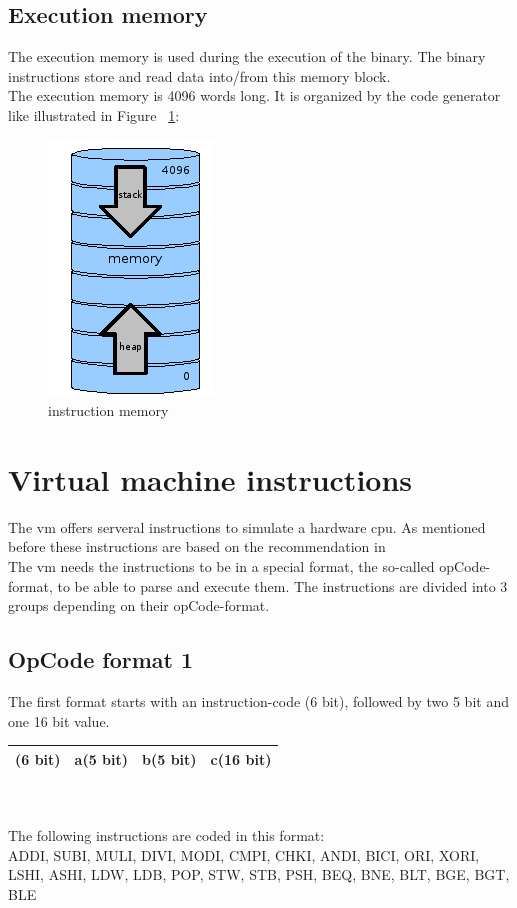 \subsection{Execution memory}
The execution memory is used during the execution of the binary. The binary
instructions store and read data into/from this memory block. \\
The execution memory is 4096 words long. It is organized by the code generator
like illustrated in Figure ~\ref{vm:instruction_memory:example}: \\
\begin{figure}
	\begin{center}
		\includegraphics{images/instruction_memory.png}
	\end{center}
	\caption{instruction memory}
	\label{vm:instruction_memory:example}
\end{figure}
\section{Virtual machine instructions}
The vm offers serveral instructions to simulate a hardware cpu. As mentioned
before these instructions are based on the recommendation in \cite{wirth}
\\
The vm needs the instructions to be in a special format, the so-called
opCode-format, to be able to parse and execute them. The instructions are
divided into 3 groups depending on their opCode-format.
\\
\subsection{OpCode format 1}
The first format starts with an instruction-code (6 bit), followed by two 5 bit
and one 16 bit value. \\
\begin{tabular}{| p{1.5cm} | p{1.25cm} | p{1.25cm} | p{4cm} |}
			\hline
			(6 bit) & a(5 bit) & b(5 bit) & c(16 bit) \\ 
			\hline  
\end{tabular}
\\ \\
The following instructions are coded in this format: \\
ADDI, SUBI, MULI, DIVI, MODI, CMPI, CHKI, ANDI, BICI, ORI, XORI,
LSHI, ASHI, LDW, LDB, POP, STW, STB, PSH, BEQ, BNE, BLT, BGE, BGT, BLE
\\

